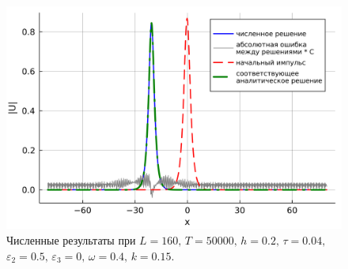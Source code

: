 \documentclass[14pt,a4paper]{extreport}
\begin{document}
			\begin{figure}[H] %
				\begin{center}
					\begin{minipage}[h]{0.48\linewidth}
						\includegraphics[width=1\linewidth]{fig76.png}
					\end{minipage}
					\hfill
					\begin{minipage}[h]{0.48\linewidth}
					\end{minipage}
				\end{center}
				\caption{Численные результаты при
				\(L=160,\, T=50000,\, h=0.2,\, \tau=0.04,\)
				\(\varepsilon_{2}=0.5,\,\varepsilon_{3}=0,\, \omega=0.4,\, k=0.15\).}
				\label{fig340-5_3}
			\end{figure}
\end{document}
